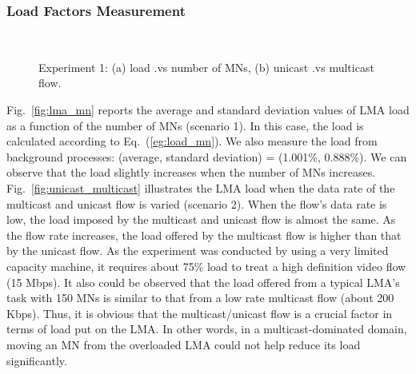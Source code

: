\subsubsection{Load Factors Measurement}
\begin{figure}[h!]
\centering
{}\,\,\,\,\,\,
\caption[Load factors measurement.]{Experiment 1: (a) load .vs number of MNs, (b) unicast .vs multicast flow.}
\label{fig:experiment1}
\end{figure}
Fig.~\ref{fig:lma_mn} reports the average and standard deviation values of LMA load as a function of the number of MNs (scenario 1). In this case, the load is calculated according to Eq.~(\ref{eg:load_mn}). We also measure the load from background processes: (average, standard deviation) = (1.001\%, 0.888\%). We can observe that the load slightly increases when the number of MNs increases. Fig.~\ref{fig:unicast_multicast} illustrates the LMA load when the data rate of the multicast and unicast flow is varied (scenario 2). When the flow's data rate is low, the load imposed by the multicast and unicast flow is almost the same.  As the flow rate increases, the load offered by the multicast flow is higher than that by the unicast flow. As the experiment was conducted by using a very limited capacity machine, it requires about 75\% load to treat a high definition video flow (15 Mbps). 
It also could be observed that the load offered from a typical LMA's task with 150 MNs is similar to that from a low rate multicast flow (about 200 Kbps). Thus, it is obvious that the multicast/unicast flow is a crucial factor in terms of load put on the LMA. In other words, in a multicast-dominated domain, moving an MN from the overloaded LMA could not help reduce its load significantly. 

